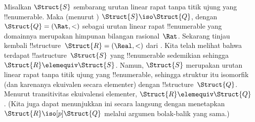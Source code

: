 \documentclass[../../../include/open-logic-section]{subfiles}
\begin{document}
\begin{rem}
  Misalkan $\Struct{S}$ sembarang urutan linear rapat tanpa titik ujung yang
  !!{enumerable}. Maka (menurut ) $\Struct{S} \iso
  \Struct{Q}$, dengan $\Struct{Q} = (\Rat, <)$ sebagai urutan linear rapat
  !!{enumerable} yang domainnya merupakan himpunan bilangan rasional~$\Rat$.
  Sekarang tinjau kembali !!{structure}~$\Struct{R} = (\Real, <)$ dari
  . Kita telah melihat bahwa terdapat
  !!a{structure}~$\Struct{S}$ yang !!{enumerable} sedemikian sehingga
  $\Struct{R} \elemequiv \Struct{S}$. Namun, $\Struct{S}$ merupakan
  urutan linear rapat tanpa titik ujung yang !!{enumerable}, sehingga struktur itu
  isomorfik (dan karenanya ekuivalen secara elementer) dengan
  !!{structure}~$\Struct{Q}$. Menurut transitivitas ekuivalensi elementer,
  $\Struct{R} \elemequiv \Struct{Q}$. (Kita juga dapat menunjukkan ini
  secara langsung dengan menetapkan $\Struct{R} \iso[p] \Struct{Q}$ melalui
  argumen bolak-balik yang sama.)
\end{rem}
\end{document}
